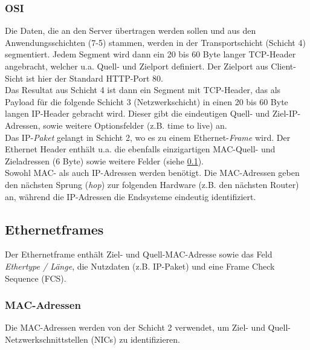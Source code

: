 \documentclass[11pt, a4paper]{article}
\begin{document}
\begin{figure}[H]
\centering
{}
\end{figure}

\subsubsection{OSI}
Die Daten, die an den Server übertragen werden sollen und aus den Anwendungsschichten (7-5) stammen, werden in der Transportschicht (Schicht 4) segmentiert. Jedem Segment wird dann ein 20 bis 60 Byte langer TCP-Header angebracht, welcher u.a. Quell- und Zielport definiert. Der Zielport aus Client-Sicht ist hier der Standard HTTP-Port 80. \\

Das Resultat aus Schicht 4 ist dann ein Segment mit TCP-Header, das als Payload für die folgende Schicht 3 (Netzwerkschicht) in einen 20 bis 60 Byte langen IP-Header gebracht wird. Dieser gibt die eindeutigen Quell- und Ziel-IP-Adressen, sowie weitere Optionsfelder (z.B. time to live) an.\\

Das IP-\emph{Paket} gelangt in Schicht 2, wo es zu einem Ethernet-\emph{Frame} wird. Der Ethernet Header enthält u.a. die ebenfalls einzigartigen MAC-Quell- und Zieladressen (6 Byte) sowie weitere Felder (siehe \ref{A4.6}).\\

Sowohl MAC- als auch IP-Adressen werden benötigt. Die MAC-Adressen geben den nächsten Sprung (\emph{hop}) zur folgenden Hardware (z.B. den nächsten Router) an, während die IP-Adressen die Endsysteme eindeutig identifiziert.\\

\subsection{Ethernetframes}\label{A4.6}

\begin{figure}[H]
\centering
{}
\end{figure}

Der Ethernetframe enthält Ziel- und Quell-MAC-Adresse sowie das Feld \emph{Ethertype / Länge}, die Nutzdaten (z.B. IP-Paket) und eine Frame Check Sequence (FCS).\\

\subsubsection{MAC-Adressen}
Die MAC-Adressen werden von der Schicht 2 verwendet, um Ziel- und Quell-Netzwerkschnittstellen (NICs) zu identifizieren.
\end{document}
